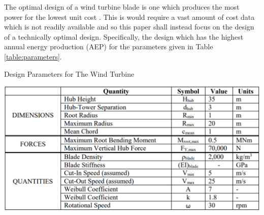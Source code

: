 \documentclass[11pt]{article}
\begin{document}
The optimal design of a wind turbine blade is one which produces the most power for the lowest unit cost \cite{handout}. This is would require a vast amount of cost data which is not readily available and so this paper shall instead focus on the design of a technically optimal design. Specifically, the design which has the highest annual energy production (AEP) for the parameters given in Table \ref{table:parameters}. 


\begin{table}
	\centering
	\caption{Design Parameters for The Wind Turbine \cite{handout}}
	\label{table:parameters}
	\includegraphics[width = 0.8\linewidth]{ParameterTable}
\end{table}

\FloatBarrier
\end{document}
